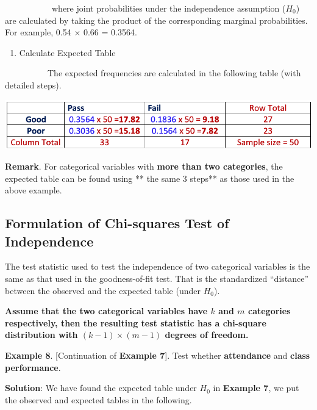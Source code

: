 \documentclass[
]{article}
\providecommand{\tightlist}{%
  \setlength{\itemsep}{0pt}\setlength{\parskip}{0pt}}
\begin{document}
~~~~~~~~~~~where joint probabilities under the independence assumption
(\(H_0\)) are calculated by taking the product of the corresponding
marginal probabilities. For example, 0.54 \(\times\) 0.66 = 0.3564.

\begin{enumerate}
\def\labelenumi{\arabic{enumi}.}
\setcounter{enumi}{2}
\tightlist
\item
  Calculate Expected Table
\end{enumerate}

~~~~~~~~~~The expected frequencies are calculated in the following table
(with detailed steps).

\begin{center}\includegraphics[width=0.65\linewidth]{week13/expectedTable} \end{center}

\hfill\break

\textbf{Remark}. For categorical variables with \textbf{more than two
categories}, the expected table can be found using ** the same 3 steps**
as those used in the above example.

\hfill\break

\hypertarget{formulation-of-chi-squares-test-of-independence}{%
\subsection{Formulation of Chi-squares Test of
Independence}\label{formulation-of-chi-squares-test-of-independence}}

The test statistic used to test the independence of two categorical
variables is the same as that used in the goodness-of-fit test. That is
the standardized ``distance'' between the observed and the expected
table (under \(H_0\)).

\textbf{Assume that the two categorical variables have \(k\) and \(m\)
categories respectively, then the resulting test statistic has a
chi-square distribution with \((k-1)\times(m-1)\) degrees of freedom.}

\textbf{Example 8}. {[}Continuation of \textbf{Example 7}{]}. Test
whether \textbf{attendance} and \textbf{class performance}.

\textbf{Solution}: We have found the expected table under \(H_0\) in
\textbf{Example 7}, we put the observed and expected tables in the
following.
\end{document}
